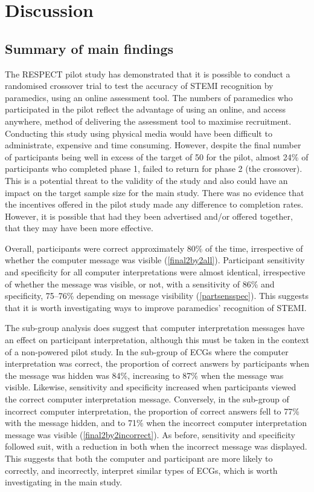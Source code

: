 \chapter{Discussion}
\label{discussion}


\section{Summary of main findings}
\label{summaryofmainfindings}

The RESPECT pilot study has demonstrated that it is possible to conduct a randomised crossover trial to test the accuracy of STEMI recognition by paramedics, using an online assessment tool. The numbers of paramedics who participated in the pilot reflect the advantage of using an online, and access anywhere, method of delivering the assessment tool to maximise recruitment. Conducting this study using physical media would have been difficult to administrate, expensive and time consuming. However, despite the final number of participants being well in excess of the target of 50 for the pilot, almost 24\% of participants who completed phase 1, failed to return for phase 2 (the crossover). This is a potential threat to the validity of the study and also could have an impact on the target sample size for the main study. There was no evidence that the incentives offered in the pilot study made any difference to completion rates. However, it is possible that had they been advertised and\slash or offered together, that they may have been more effective.

Overall, participants were correct approximately 80\% of the time, irrespective of whether the computer message was visible (\autoref{final2by2all}). Participant sensitivity and specificity for all computer interpretations were almost identical, irrespective of whether the message was visible, or not, with a sensitivity of 86\% and specificity, 75--76\% depending on message visibility (\autoref{partsensspec}). This suggests that it is worth investigating ways to improve paramedics' recognition of STEMI.

The sub-group analysis does suggest that computer interpretation messages have an effect on participant interpretation, although this must be taken in the context of a non-powered pilot study. In the sub-group of ECGs where the computer interpretation was correct, the proportion of correct answers by participants when the message was hidden was 84\%, increasing to 87\% when the message was visible. Likewise, sensitivity and specificity increased when participants viewed the correct computer interpretation message. Conversely, in the sub-group of incorrect computer interpretation, the proportion of correct answers fell to 77\% with the message hidden, and to 71\% when the incorrect computer interpretation message was visible (\autoref{final2by2incorrect}). As before, sensitivity and specificity followed suit, with a reduction in both when the incorrect message was displayed. This suggests that both the computer and participant are more likely to correctly, and incorrectly, interpret similar types of ECGs, which is worth investigating in the main study.

